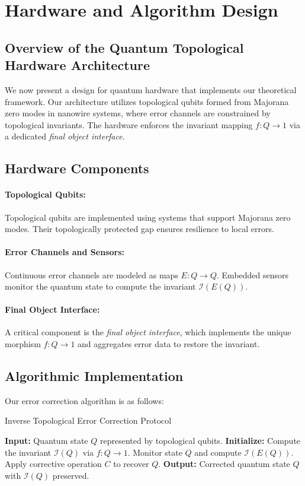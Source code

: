 \documentclass[11pt]{article}
\begin{document}
\section{Hardware and Algorithm Design}
\label{sec:hardware}
\subsection{Overview of the Quantum Topological Hardware Architecture}
We now present a design for quantum hardware that implements our theoretical framework. Our architecture utilizes topological qubits formed from Majorana zero modes in nanowire systems, where error channels are constrained by topological invariants. The hardware enforces the invariant mapping \(f: Q \to 1\) via a dedicated \emph{final object interface}.

\subsection{Hardware Components}
\paragraph{Topological Qubits:}  
Topological qubits are implemented using systems that support Majorana zero modes. Their topologically protected gap ensures resilience to local errors.

\paragraph{Error Channels and Sensors:}  
Continuous error channels are modeled as maps \(E: Q \to Q\). Embedded sensors monitor the quantum state to compute the invariant \(\mathcal{I}(E(Q))\).

\paragraph{Final Object Interface:}  
A critical component is the \emph{final object interface}, which implements the unique morphism \(f: Q \to 1\) and aggregates error data to restore the invariant.

\subsection{Algorithmic Implementation}
Our error correction algorithm is as follows:
\begin{algorithm}[H]
\caption{Inverse Topological Error Correction Protocol}\label{alg:itec}
\begin{algorithmic}[1]
\State \textbf{Input:} Quantum state \(Q\) represented by topological qubits.
\State \textbf{Initialize:} Compute the invariant \(\mathcal{I}(Q)\) via \(f: Q \to 1\).
\Repeat
    \State Monitor state \(Q\) and compute \(\mathcal{I}(E(Q))\).
        \State Apply corrective operation \(C\) to recover \(Q\).
    \EndIf
{}
\State \textbf{Output:} Corrected quantum state \(Q\) with \(\mathcal{I}(Q)\) preserved.
\end{algorithmic}
\end{algorithm}
\end{document}
